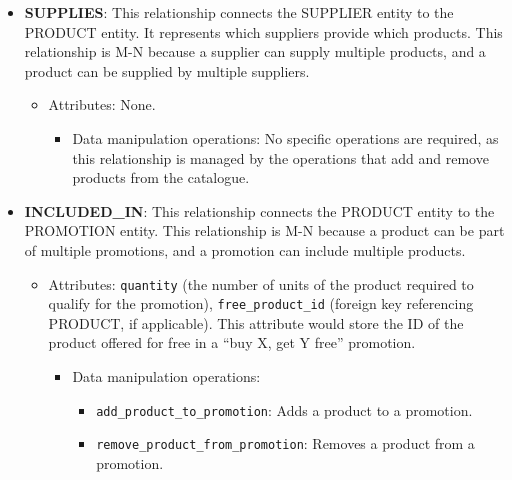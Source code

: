 \documentclass[
]{report}
\providecommand{\tightlist}{%
  \setlength{\itemsep}{0pt}\setlength{\parskip}{0pt}}\usepackage{longtable,booktabs,array}
\begin{document}
\begin{itemize}
\item
  \textbf{SUPPLIES}: This relationship connects the SUPPLIER entity to
  the PRODUCT entity. It represents which suppliers provide which
  products. This relationship is M-N because a supplier can supply
  multiple products, and a product can be supplied by multiple
  suppliers.

  \begin{itemize}
  \item
    Attributes: None.

    \begin{itemize}
    \tightlist
    \item
      Data manipulation operations: No specific operations are required,
      as this relationship is managed by the operations that add and
      remove products from the catalogue.
    \end{itemize}
  \end{itemize}
\item
  \textbf{INCLUDED\_IN}: This relationship connects the PRODUCT entity
  to the PROMOTION entity. This relationship is M-N because a product
  can be part of multiple promotions, and a promotion can include
  multiple products.

  \begin{itemize}
  \item
    Attributes: \texttt{quantity} (the number of units of the product
    required to qualify for the promotion), \texttt{free\_product\_id}
    (foreign key referencing PRODUCT, if applicable). This attribute
    would store the ID of the product offered for free in a ``buy X, get
    Y free'' promotion.

    \begin{itemize}
    \item
      Data manipulation operations:

      \begin{itemize}
      \tightlist
      \item
        \texttt{add\_product\_to\_promotion}: Adds a product to a
        promotion.
      \item
        \texttt{remove\_product\_from\_promotion}: Removes a product
        from a promotion.
      \end{itemize}
    \end{itemize}
  \end{itemize}
\end{itemize}
\end{document}
